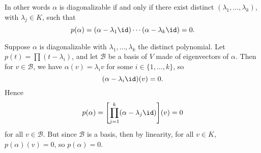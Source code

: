 \documentclass[12pt]{article}
\begin{document}
In other words $\alpha$ is diagonalizable if and only if there exist distinct $(\lambda_1, \ldots, \lambda_k)$, with $\lambda_j \in K$, such that
\[
	p(\alpha) = (\alpha - \lambda_1 \id) \cdots (\alpha - \lambda_k \id) = 0
.\]

\begin{proofbox}
	Suppose $\alpha$ is diagonalizable with $\lambda_1, \ldots, \lambda_k$ the distinct polynomial. Let $p(t) = \prod (t - \lambda_i)$, and let $\mathcal{B}$ be a basis of $V$ made of eigenvectors of $\alpha$. Then for $v \in \mathcal{B}$, we have $\alpha(v) = \lambda_i v$ for some $i \in \{1, \ldots, k\}$, so
	\[
		(\alpha - \lambda_i \id)(v) = 0
	.\]
	Hence
	\[
		p(\alpha) = \Biggl[ \prod_{j = 1}^{k} (\alpha - \lambda_j \id) \Biggr] (v) = 0
	\]
	for all $v \in \mathcal{B}$. But since $\mathcal{B}$ is a basis, then by linearity, for all $v \in K$, $p(\alpha)(v) = 0$, so $p(\alpha) = 0$.


\end{proofbox}
\end{document}
